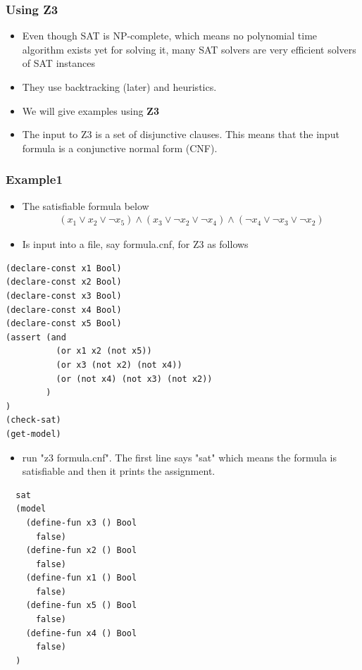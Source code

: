 \documentclass{beamer}
\begin{document}
\begin{frame}
  \frametitle{Using Z3}
  \begin{itemize}
  \item Even though SAT is NP-complete, which means no polynomial time algorithm exists yet for solving it, many SAT solvers are very efficient solvers of SAT
  instances
\item They use backtracking (later) and heuristics.
  \item We will give examples using \textbf{Z3}
  \item The input to Z3 is a set of disjunctive clauses. This means that the input formula is a conjunctive normal form (CNF).
  \end{itemize}
\end{frame}
\begin{frame}[fragile]
  \frametitle{Example1}
  \begin{itemize}
  \item The satisfiable formula below
 \begin{align*}
      \left(x_1\lor x_2\lor\lnot x_5  \right) \land \left(x_3\lor\lnot x_2\lor\lnot x_4  \right)\land \left(\lnot x_4\lor\lnot x_3\lor\lnot x_2  \right)
    \end{align*}
\item Is input into a file, say formula.cnf, for Z3 as follows
  \end{itemize}

\begin{verbatim}
(declare-const x1 Bool)
(declare-const x2 Bool)
(declare-const x3 Bool)
(declare-const x4 Bool)
(declare-const x5 Bool)
(assert (and 
          (or x1 x2 (not x5))
          (or x3 (not x2) (not x4))
          (or (not x4) (not x3) (not x2))
        )
)
(check-sat)
(get-model)
\end{verbatim}

\end{frame}
\begin{frame}[fragile]
  \begin{itemize}
  \item run "z3 formula.cnf". The first line says "sat" which means the formula is satisfiable and then it prints the assignment.
  \end{itemize}

\begin{verbatim}
  sat
  (model
    (define-fun x3 () Bool
      false)
    (define-fun x2 () Bool
      false)
    (define-fun x1 () Bool
      false)
    (define-fun x5 () Bool
      false)
    (define-fun x4 () Bool
      false)
  )
\end{verbatim}
\end{frame}
\end{document}
